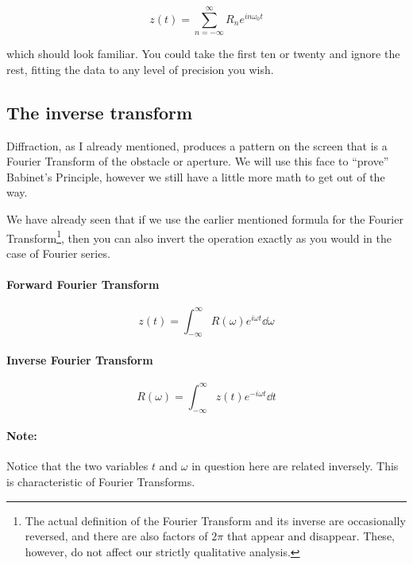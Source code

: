 \begin{equation*}
z(t) = \sum_{n = -\infty}^\infty R_n e^{i n \omega_0 t}
\end{equation*}

which should look familiar. You could take the first ten or twenty and ignore the rest, fitting the data to any level of precision you wish.

\subsection{The inverse transform}

Diffraction, as I already mentioned, produces a pattern on the screen that is a Fourier Transform of the obstacle or aperture. We will use this face to ``prove'' Babinet's Principle, however we still have a little more math to get out of the way. 

We have already seen that if we use the earlier mentioned formula for the Fourier Transform\footnote{The actual definition of the Fourier Transform and its inverse are occasionally reversed, and there are also factors of $2\pi$ that appear and disappear. These, however, do not affect our strictly qualitative analysis.}, then you can also invert the operation exactly as you would in the case of Fourier series. 

\begin{tcolorbox}

\paragraph{Forward Fourier Transform}

\begin{equation*}
z(t) = \int^\infty_{-\infty} R(\omega) e^{i \omega t} \dd \omega
\end{equation*}

\paragraph{Inverse Fourier Transform}

\begin{equation*}
R(\omega) = \int^\infty_{-\infty} z(t) e^{-i \omega t} \dd t
\end{equation*}

\paragraph{Note: } Notice that the two variables $t$ and $\omega$ in question here are related inversely. This is characteristic of Fourier Transforms.

\end{tcolorbox}

